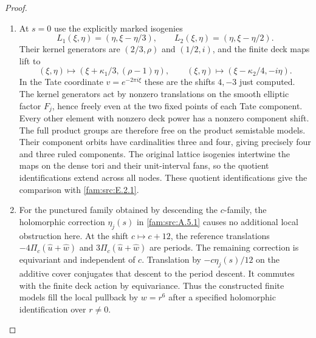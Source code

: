 \begin{proof}
\begin{enumerate}[label=\arabic*.,leftmargin=*]
\item At $s=0$ use the explicitly marked isogenies
\[
 L_1(\xi,\eta)=(\eta,\xi-\eta/3),\qquad
 L_2(\xi,\eta)=(\eta,\xi-\eta/2).
\]
Their kernel generators are $(2/3,\rho)$ and $(1/2,i)$,
and the finite deck maps lift to
\[
 (\xi,\eta)\mapsto(\xi+\kappa_1/3,(\rho-1)\eta),
 \qquad
 (\xi,\eta)\mapsto(\xi-\kappa_2/4,-i\eta).
\]
In the Tate coordinate $v=e^{-2\pi i\xi}$ these are the
shifts $4,-3$ just computed. The kernel generators act
by nonzero translations on the smooth elliptic factor
$F_j$, hence freely even at the two fixed points of each
Tate component. Every other element with nonzero deck
power has a nonzero component shift. The full product
groups are therefore free on the product semistable
models. Their component orbits have cardinalities three
and four, giving precisely four and three ruled
components. The original lattice isogenies intertwine
the maps on the dense tori and their unit-interval fans,
so the quotient identifications extend across all nodes.
These quotient identifications give the comparison with \cref{fam:src:E.2.1}.

\item For the punctured family obtained by descending the
$c$-family, the holomorphic correction $\eta_j(s)$ in
\cref{fam:src:A.5.1} causes no additional local obstruction here. At the
shift $c\mapsto c+12$, the reference translations
$-4\Pi_c(\widehat u+\widehat w)$ and
$3\Pi_c(\widehat u+\widehat w)$ are periods.
The remaining correction is equivariant and independent
of $c$. Translation by $-c\eta_j(s)/12$ on the additive
cover conjugates that descent to the period descent.
It commutes with the finite deck action by equivariance.
Thus the constructed finite models fill the local
pullback by $w=r^6$ after a specified holomorphic
identification over $r\ne0$. 
\end{enumerate}
\end{proof}
